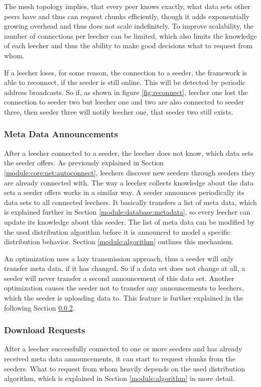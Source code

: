 The mesh topology implies, that every peer knows exactly, what data sets other peers have and thus can request chunks efficiently, though it adds exponentially growing overhead and thus does not scale indefinitely. To improve scalability, the number of connections per leecher can be limited, which also limits the knowledge of each leecher and thus the ability to make good decisions what to request from whom.

If a leecher loses, for some reason, the connection to a seeder, the framework is able to reconnect, if the seeder is still online. This will be detected by periodic address broadcasts. So if, as shown in figure \ref{fig:reconnect}, leecher one lost the connection to seeder two but leecher one and two are also connected to seeder three, then seeder three will notify leecher one, that seeder two still exists.


\subsubsection{Meta Data Announcements}
\label{module:core:net:annoucements}
After a leecher connected to a seeder, the leecher does not know, which data sets the seeder offers. As previously explained in Section \ref{module:core:net:autoconnect}, leechers discover new seeders through seeders they are already connected with. The way a leecher collects knowledge about the data sets a seeder offers works in a similar way. A seeder announces periodically its data sets to all connected leechers. It basically transfers a list of meta data, which is explained further in Section \ref{module:database:metadata}, so every leecher can update its knowledge about this seeder. The list of meta data can be modified by the used distribution algorithm before it is announced to model a specific distribution behavior. Section \ref{module:algorithm} outlines this mechanism.

An optimization uses a lazy transmission approach, thus a seeder will only transfer meta data, if it has changed. So if a data set does not change at all, a seeder will never transfer a second announcement of this data set. Another optimization causes the seeder not to transfer any announcements to leechers, which the seeder is uploading data to. This feature is further explained in the following Section \ref{module:core:net:downloadreq}.


\subsubsection{Download Requests}
\label{module:core:net:downloadreq}
After a leecher successfully connected to one or more seeders and has already received meta data announcements, it can start to request chunks from the seeders. What to request from whom heavily depends on the used distribution algorithm, which is explained in Section \ref{module:algorithm} in more detail. 

